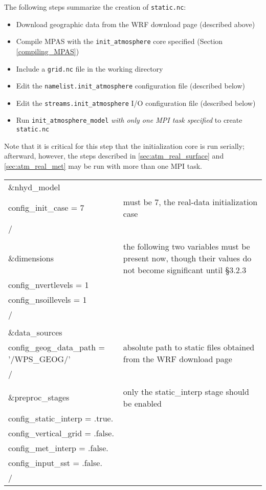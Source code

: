 The following steps summarize the creation of {\tt static.nc}:

\begin{itemize}
\item Download geographic data from the WRF download page (described above) 
\item Compile MPAS with the {\tt init\_atmosphere} core specified (Section \ref{compiling_MPAS})
\item Include a {\tt grid.nc} file in the working directory
\item Edit the {\tt namelist.init\_atmosphere} configuration file (described below)
\item Edit the {\tt streams.init\_atmosphere} I/O configuration file (described below)
\item Run {\tt init\_atmosphere\_model} {\em with only one MPI task specified} to create {\tt static.nc}
\end{itemize}
Note that it is critical for this step that the initialization core is run serially; afterward, however, the steps described in \ref{sec:atm_real_surface} and \ref{sec:atm_real_met} may be run with more than one MPI task.

\begin{longtable}{p{3.0in} |p{3.25in}}

\&nhyd\_model\\
   config\_init\_case       = 7                      & must be 7, the real-data initialization case \\
/\\
\\
\&dimensions                                         & the following two variables must be present now, though their values do not become significant until \S 3.2.3 \\
   config\_nvertlevels     = 1                      &  \\
   config\_nsoillevels     = 1                       &  \\
/\\
\\
\&data\_sources\\
   config\_geog\_data\_path  = '/WPS\_GEOG/'         & absolute path to static files obtained from the WRF download page\\
/\\
\\
\&preproc\_stages                                    & only the static\_interp stage should be enabled \\
   config\_static\_interp   = .true.                 & \\
   config\_vertical\_grid   = .false.                & \\
   config\_met\_interp      = .false.                & \\
   config\_input\_sst       = .false.                & \\
/\\

\end{longtable}

